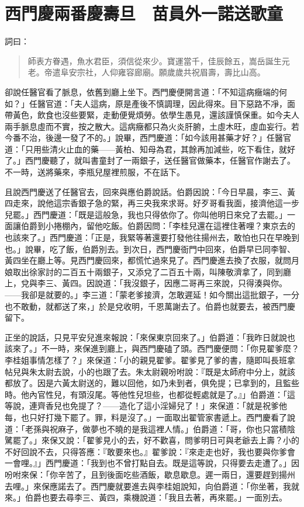 
\chapter{西門慶兩番慶壽旦　苗員外一諾送歌童}

詞曰：
\begin{quote}
師表方眷遇，魚水君臣，須信從來少。寶運當千，佳辰餘五，嵩岳誕生元老。帝遣阜安宗社，人仰雍容廊廟。願歲歲共祝眉壽，壽比山高。
\end{quote}

卻說任醫官看了脈息，依舊到廳上坐下。西門慶便開言道：「不知這病癥端的何如？」任醫官道：「夫人這病，原是產後不慎調理，因此得來。目下惡路不凈，面帶黃色，飲食也沒些要緊，走動便覺煩勞。依學生愚見，還該謹慎保重。如今夫人兩手脈息虛而不實，按之散大。這病癥都只為火炎肝腑，土虛木旺，虛血妄行。若今番不治，後邊一發了不的。」說畢，西門慶道：「如今該用甚藥才好？」任醫官道：「只用些清火止血的藥——黃柏、知母為君，其餘再加減些，吃下看住，就好了。」西門慶聽了，就叫書童封了一兩銀子，送任醫官做藥本，任醫官作謝去了。不一時，送將藥來，李瓶兒屋裡煎服，不在話下。

且說西門慶送了任醫官去，回來與應伯爵說話。伯爵因說：「今日早晨，李三、黃四走來，說他這宗香銀子急的緊，再三央我來求哥。好歹哥看我面，接濟他這一步兒罷。」西門慶道：「既是這般急，我也只得依你了。你叫他明日來兌了去罷。」一面讓伯爵到小捲棚內，留他吃飯。伯爵因問：「李桂兒還在這裡住著哩？東京去的也該來了。」西門慶道：「正是，我緊等著還要打發他往揚州去，敢怕也只在早晚到也。」說畢，吃了飯，伯爵別去。到次日，西門慶衙門中回來，伯爵早已同李智、黃四坐在廳上等。見西門慶回來，都慌忙過來見了。西門慶進去換了衣服，就問月娘取出徐家討的二百五十兩銀子，又添兌了二百五十兩，叫陳敬濟拿了，同到廳上，兌與李三、黃四。因說道：「我沒銀子，因應二哥再三來說，只得湊與你。——我卻是就要的。」李三道：「蒙老爹接濟，怎敢遲延！如今關出這批銀子，一分也不敢動，就都送了來，」於是兌收明，千恩萬謝去了。伯爵也就要去，被西門慶留下。

正坐的說話，只見平安兒進來報說：「來保東京回來了。」伯爵道：「我昨日就說也該來了。」不一時，來保進到廳上，與西門慶磕了頭。西門慶便問：「你見翟爹麼？李桂姐事情怎樣了？」來保道：「小的親見翟爹。翟爹見了爹的書，隨即叫長班拿帖兒與朱太尉去說，小的也跟了去。朱太尉親吩咐說：『既是太師府中分上，就該都放了。因是六黃太尉送的，難以回他，如乃未到者，俱免提；已拿到的，且監些時。他內官性兒，有頭沒尾。等他性兒坦些，也都從輕處就是了。』」伯爵道：「這等說，連齊香兒也免提了？——造化了這小淫婦兒了！」來保道：「就是祝爹他每，也只好打幾下罷了。罪，料是沒了。」一面取出翟管家書遞上。西門慶看了說道：「老孫與祝麻子，做夢也不曉的是我這裡人情。」伯爵道：「哥，你也只當積陰騭罷了。」來保又說：「翟爹見小的去，好不歡喜，問爹明日可與老爺去上壽？小的不好回說不去，只得答應：『敢要來也。』翟爹說：『來走走也好，我也要與你爹會一會哩。』」西門慶道：「我到也不曾打點自去。既是這等說，只得要去走遭了。」因吩咐來保：「你辛苦了，且到後面吃些酒飯，歇息歇息。遲一兩日，還要趕到揚州去哩。」來保應諾去了。西門慶就要進去與李桂姐說知，向伯爵道：「你坐著，我就來。」伯爵也要去尋李三、黃四，乘機說道：「我且去著，再來罷。」一面別去。

